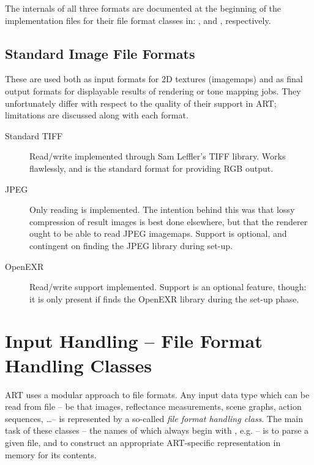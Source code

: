The internals of all three formats are documented at the beginning of the
implementation files for their file format classes in:
,  and
,
respectively.

\section{Standard Image File Formats}
These are used both as input formats for 2D textures (imagemaps) and as final
output formats for displayable results of rendering or tone mapping jobs. They
unfortunately differ with respect to the quality of their support in ART;
limitations are discussed along with each format.

\begin{description}
\item[Standard TIFF] Read/write implemented through Sam Leffler's TIFF
  library. Works flawlessly, and is the standard format for providing
  RGB output.
\item[JPEG] Only reading is implemented. The intention behind this was
  that lossy compression of result images is best done elsewhere, but
  that the renderer ought to be able to read JPEG imagemaps. Support is optional, and contingent on  finding the JPEG library during set-up.
\item[OpenEXR] Read/write support implemented. Support is an optional feature, though: it is only present if  finds the OpenEXR library during the set-up phase.
\end{description}


\chapter{Input Handling  --  File Format Handling Classes}
\label{sec:Background:InputHandling}

ART uses a modular approach to file formats. Any input data type which
can be read from file -- be that images, reflectance measurements,
scene graphs, action sequences, \ldots -- is represented by a so-called
\emph{file format handling class}. The main task of these
classes -- the names of which always begin with , e.g.
 -- is to parse a given file, and to construct an
appropriate ART-specific representation in memory for its contents.

